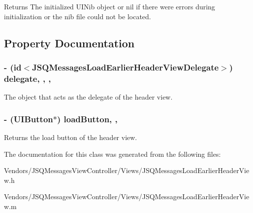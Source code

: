 \begin{DoxyReturn}{Returns}
The initialized {\ttfamily U\+I\+Nib} object or {\ttfamily nil} if there were errors during initialization or the nib file could not be located. 
\end{DoxyReturn}


\subsection{Property Documentation}
\hypertarget{interface_j_s_q_messages_load_earlier_header_view_a4095ce0524c0badf3f2b2e8323df8824}{}
\subsubsection[{delegate}]{\setlength{\rightskip}{0pt plus 5cm}-\/ (id$<${\bf J\+S\+Q\+Messages\+Load\+Earlier\+Header\+View\+Delegate}$>$) delegate\hspace{0.3cm}{\ttfamily [read]}, {\ttfamily [write]}, {\ttfamily [nonatomic]}, {\ttfamily [weak]}}\label{interface_j_s_q_messages_load_earlier_header_view_a4095ce0524c0badf3f2b2e8323df8824}
The object that acts as the delegate of the header view. \hypertarget{interface_j_s_q_messages_load_earlier_header_view_aaffe7fd60c12209886809afa39c3f7dc}{}
\subsubsection[{load\+Button}]{\setlength{\rightskip}{0pt plus 5cm}-\/ (U\+I\+Button$\ast$) load\+Button\hspace{0.3cm}{\ttfamily [read]}, {\ttfamily [nonatomic]}, {\ttfamily [weak]}}\label{interface_j_s_q_messages_load_earlier_header_view_aaffe7fd60c12209886809afa39c3f7dc}
Returns the load button of the header view. 

The documentation for this class was generated from the following files\+:\begin{DoxyCompactItemize}
\item 
Vendors/\+J\+S\+Q\+Messages\+View\+Controller/\+Views/J\+S\+Q\+Messages\+Load\+Earlier\+Header\+View.\+h\item 
Vendors/\+J\+S\+Q\+Messages\+View\+Controller/\+Views/J\+S\+Q\+Messages\+Load\+Earlier\+Header\+View.\+m\end{DoxyCompactItemize}
